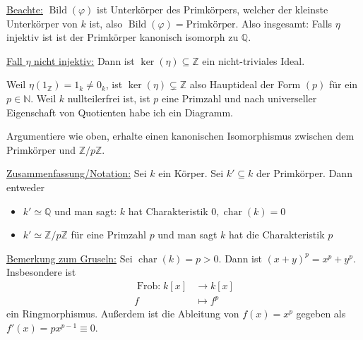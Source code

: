 \documentclass[12pt,parskip=full]{scrartcl}
\newcommand{\setN}{\mathbb{N}}
\newcommand{\setZ}{\mathbb{Z}}
\newcommand{\setQ}{\mathbb{Q}}
\newcommand{\heading}{\underline}
\theoremstyle{definition}
\theoremstyle{remark}
\begin{document}
	\heading{Beachte:} $\operatorname{Bild}(\varphi)$ ist Unterkörper des Primkörpers, welcher der kleinste Unterkörper von $k$ ist, also $\operatorname{Bild}(\varphi) = \text{Primkörper}$. Also insgesamt: Falls $\eta$ injektiv ist ist der Primkörper kanonisch isomorph zu $\setQ$.
	
	\heading{Fall $\eta$ nicht injektiv:} Dann ist $\ker(\eta) \subseteq \setZ$ ein nicht-triviales Ideal.
	
	Weil $\eta(1_\setZ) = 1_k \neq 0_k$, ist $\ker(\eta) \subsetneq \setZ$ also Hauptideal der Form $(p)$ für ein $p \in \setN$. Weil $k$ nullteilerfrei ist, ist $p$ eine Primzahl und nach universeller Eigenschaft von Quotienten habe ich ein Diagramm.
	
	\begin{center}
	\end{center}

	Argumentiere wie oben, erhalte einen kanonischen Isomorphismus zwischen dem Primkörper und $\setZ / p \setZ$.
	
	\heading{Zusammenfassung/Notation:} Sei $k$ ein Körper. Sei $k' \subseteq k$ der Primkörper. Dann entweder
	\begin{itemize}
		\item $k' \simeq \setQ$ und man sagt: $k$ hat Charakteristik $0, \operatorname{char}(k) = 0$
		\item $k' \simeq \setZ / p \setZ$ für eine Primzahl $p$ und man sagt $k$ hat die Charakteristik $p$
	\end{itemize}

	\heading{Bemerkung zum Gruseln:} Sei $\operatorname{char}(k) = p > 0$. Dann ist $(x + y)^p = x^p + y^p$. Insbesondere ist
	\begin{align*}
		\operatorname{Frob:} k[x] &\to k[x] \\
		f &\mapsto f^p
	\end{align*}
	ein Ringmorphismus. Außerdem ist die Ableitung von $f(x) = x^p$ gegeben als $f'(x) = p x^{p-1} \equiv 0$.
	
\end{document}
